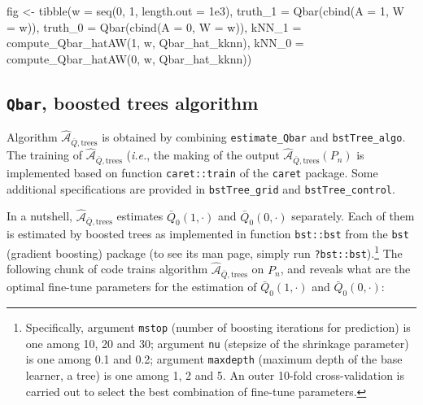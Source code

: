 \documentclass[
  11pt,
  openright,twoside]{book}
\newenvironment{Shaded}{\begin{snugshade}}{\end{snugshade}}
\newcommand{\AttributeTok}[1]{\textcolor[rgb]{0.77,0.63,0.00}{#1}}
\newcommand{\DecValTok}[1]{\textcolor[rgb]{0.00,0.00,0.81}{#1}}
\newcommand{\FloatTok}[1]{\textcolor[rgb]{0.00,0.00,0.81}{#1}}
\newcommand{\FunctionTok}[1]{\textcolor[rgb]{0.00,0.00,0.00}{#1}}
\newcommand{\NormalTok}[1]{#1}
\newcommand{\OtherTok}[1]{\textcolor[rgb]{0.56,0.35,0.01}{#1}}
\newcommand{\Algo}{\widehat{\mathcal{A}}}
\newcommand{\Qbar}{\bar{Q}}
\theoremstyle{definition}
\theoremstyle{definition}
\theoremstyle{definition}
\theoremstyle{definition}
\theoremstyle{remark}
\begin{document}
\begin{Shaded}
\begin{Highlighting}[]
\NormalTok{fig }\OtherTok{\textless{}{-}} \FunctionTok{tibble}\NormalTok{(}\AttributeTok{w =} \FunctionTok{seq}\NormalTok{(}\DecValTok{0}\NormalTok{, }\DecValTok{1}\NormalTok{, }\AttributeTok{length.out =} \FloatTok{1e3}\NormalTok{),}
              \AttributeTok{truth\_1 =} \FunctionTok{Qbar}\NormalTok{(}\FunctionTok{cbind}\NormalTok{(}\AttributeTok{A =} \DecValTok{1}\NormalTok{, }\AttributeTok{W =}\NormalTok{ w)),}
              \AttributeTok{truth\_0 =} \FunctionTok{Qbar}\NormalTok{(}\FunctionTok{cbind}\NormalTok{(}\AttributeTok{A =} \DecValTok{0}\NormalTok{, }\AttributeTok{W =}\NormalTok{ w)),}
              \AttributeTok{kNN\_1 =} \FunctionTok{compute\_Qbar\_hatAW}\NormalTok{(}\DecValTok{1}\NormalTok{, w, Qbar\_hat\_kknn),}
              \AttributeTok{kNN\_0 =} \FunctionTok{compute\_Qbar\_hatAW}\NormalTok{(}\DecValTok{0}\NormalTok{, w, Qbar\_hat\_kknn))}
\end{Highlighting}
\end{Shaded}

\hypertarget{boosted-trees}{%
\subsection{\texorpdfstring{\texttt{Qbar}, boosted trees algorithm}{Qbar, boosted trees algorithm}}\label{boosted-trees}}

Algorithm \(\Algo_{\Qbar,\text{trees}}\) is obtained by combining
\texttt{estimate\_Qbar} and \texttt{bstTree\_algo}. The training of
\(\Algo_{\Qbar,\text{trees}}\) (\emph{i.e.}, the making of the output
\(\Algo_{\Qbar,\text{trees}} (P_{n})\) is implemented based on function
\texttt{caret::train} of the \texttt{caret} package. Some additional specifications are
provided in \texttt{bstTree\_grid} and \texttt{bstTree\_control}.

In a nutshell, \(\Algo_{\Qbar,\text{trees}}\) estimates \(\Qbar_{0}(1,\cdot)\) and
\(\Qbar_{0}(0,\cdot)\) separately. Each of them is estimated by boosted trees
as implemented in function \texttt{bst::bst} from the \texttt{bst} (gradient boosting)
package (to see its man page, simply run \texttt{?bst::bst}).\footnote{Specifically, argument
  \texttt{mstop} (number of boosting iterations for prediction) is one among 10, 20 and
  30; argument \texttt{nu} (stepsize of the shrinkage parameter) is one among 0.1 and
  0.2; argument \texttt{maxdepth} (maximum depth of the base learner, a tree) is one
  among 1, 2 and 5. An outer 10-fold cross-validation is carried out to select
  the best combination of fine-tune parameters.} The following chunk of code
trains algorithm \(\Algo_{\Qbar,\text{trees}}\) on \(P_{n}\), and reveals what are
the optimal fine-tune parameters for the estimation of \(\Qbar_{0}(1,\cdot)\)
and \(\Qbar_{0}(0,\cdot)\):
\end{document}

